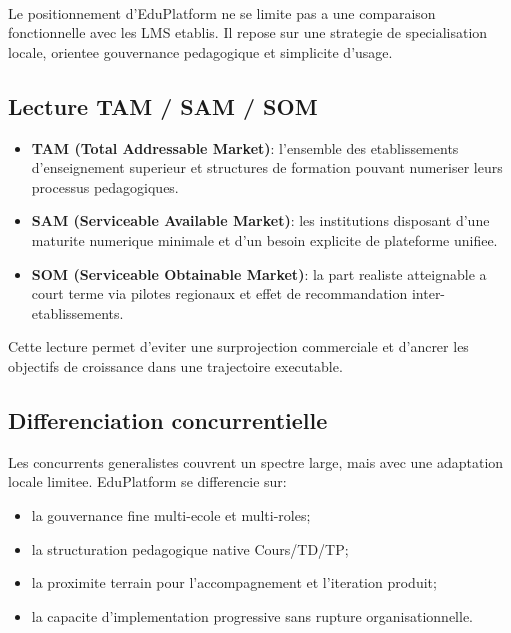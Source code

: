 ﻿﻿\documentclass[12pt,a4paper,oneside]{report}
\begin{document}
Le positionnement d'EduPlatform ne se limite pas a une comparaison fonctionnelle avec les LMS etablis. Il repose sur une strategie de specialisation locale, orientee gouvernance pedagogique et simplicite d'usage.

\subsection{Lecture TAM / SAM / SOM}

\begin{itemize}
  \item \textbf{TAM (Total Addressable Market)}: l'ensemble des etablissements d'enseignement superieur et structures de formation pouvant numeriser leurs processus pedagogiques.
  \item \textbf{SAM (Serviceable Available Market)}: les institutions disposant d'une maturite numerique minimale et d'un besoin explicite de plateforme unifiee.
  \item \textbf{SOM (Serviceable Obtainable Market)}: la part realiste atteignable a court terme via pilotes regionaux et effet de recommandation inter-etablissements.
\end{itemize}

Cette lecture permet d'eviter une surprojection commerciale et d'ancrer les objectifs de croissance dans une trajectoire executable.

\subsection{Differenciation concurrentielle}

Les concurrents generalistes couvrent un spectre large, mais avec une adaptation locale limitee. EduPlatform se differencie sur:
\begin{itemize}
  \item la gouvernance fine multi-ecole et multi-roles;
  \item la structuration pedagogique native Cours/TD/TP;
  \item la proximite terrain pour l'accompagnement et l'iteration produit;
  \item la capacite d'implementation progressive sans rupture organisationnelle.
\end{itemize}
\end{document}
